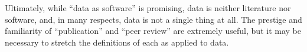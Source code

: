 \documentclass[10pt,a4paper,twocolumn]{article}
\begin{document}
Ultimately, while ``data as software'' is promising, data is neither literature nor software, and, in many respects, data is not a single thing at all.
The prestige and familiarity of ``publication'' and ``peer review'' are extremely useful, but it may be necessary to stretch the definitions of each as applied to data.


\nocite{*}
{\small
}








\end{document}
